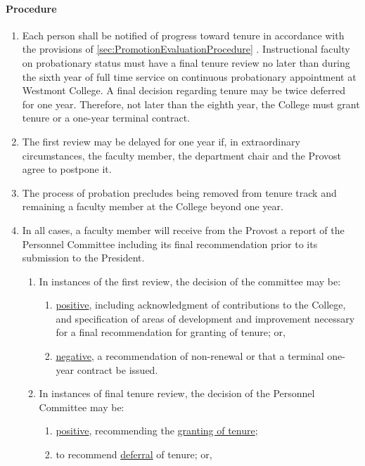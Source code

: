 			\paragraph{Procedure}
				\begin{enumerate}[label=\alph*)]
					\item{Each person shall be notified of progress toward tenure in accordance with the provisions of
						\ref{sec:PromotionEvaluationProcedure}
						.  Instructional faculty on probationary status must have a final tenure review no later than during the sixth year of full time service on continuous probationary appointment at Westmont College.  A final decision regarding tenure may be twice deferred for one year.  Therefore, not later than the eighth year, the College must grant tenure or a one-year terminal contract.}
					\item{The first review may be delayed for one year if, in extraordinary circumstances, the faculty member, the department chair and the Provost agree to postpone it.}
					\item{The process of probation precludes being removed from tenure track and remaining a faculty member at the College beyond one year.}
					\item{In all cases, a faculty member will receive from the Provost a report of the Personnel Committee including its final recommendation prior to its submission to the President.
						\begin{enumerate}[label=\arabic*)]
							\item{In instances of the first review, the decision of the committee may be:
								\begin{enumerate}[label=(\alph*)]
									\item{\underline{positive}, including acknowledgment of contributions to the College, and specification of areas of development and improvement necessary for a final recommendation for granting of tenure; or,}
									\item{\underline{negative}, a recommendation of non-renewal or that a terminal one-year contract be issued.}
								\end{enumerate}
							}
							\item{In instances of final tenure review, the decision of the Personnel Committee may be:
								\begin{enumerate}[label=(\alph*)]
									\item{\underline{positive}, recommending the \underline{granting of tenure};}
									\item{to recommend \underline{deferral} of tenure; or,}

\end{enumerate}}
\end{enumerate}}
\end{enumerate}
